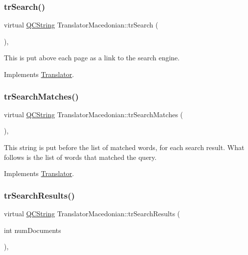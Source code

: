 \subsubsection{\texorpdfstring{trSearch()}{trSearch()}}
{\footnotesize\ttfamily virtual \mbox{\hyperlink{class_q_c_string}{Q\+C\+String}} Translator\+Macedonian\+::tr\+Search (\begin{DoxyParamCaption}{ }\end{DoxyParamCaption})\hspace{0.3cm}{\ttfamily [inline]}, {\ttfamily [virtual]}}

This is put above each page as a link to the search engine. 

Implements \mbox{\hyperlink{class_translator}{Translator}}.

\mbox{\label{class_translator_macedonian_aeeaa6c6415e05d93610e34e102715977}} 
\subsubsection{\texorpdfstring{trSearchMatches()}{trSearchMatches()}}
{\footnotesize\ttfamily virtual \mbox{\hyperlink{class_q_c_string}{Q\+C\+String}} Translator\+Macedonian\+::tr\+Search\+Matches (\begin{DoxyParamCaption}{ }\end{DoxyParamCaption})\hspace{0.3cm}{\ttfamily [inline]}, {\ttfamily [virtual]}}

This string is put before the list of matched words, for each search result. What follows is the list of words that matched the query. 

Implements \mbox{\hyperlink{class_translator}{Translator}}.

\mbox{\label{class_translator_macedonian_a7daf5f1d4e735c35965e3b9600423532}} 
\subsubsection{\texorpdfstring{trSearchResults()}{trSearchResults()}}
{\footnotesize\ttfamily virtual \mbox{\hyperlink{class_q_c_string}{Q\+C\+String}} Translator\+Macedonian\+::tr\+Search\+Results (\begin{DoxyParamCaption}\item[{int}]{num\+Documents }\end{DoxyParamCaption})\hspace{0.3cm}{\ttfamily [inline]}, {\ttfamily [virtual]}}

